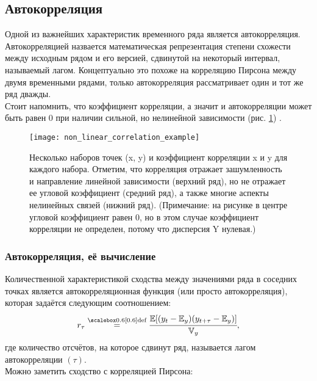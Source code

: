 \subsection{Автокорреляция}

Одной из важнейших характеристик временного ряда является автокорреляция. Автокорреляцией 
назвается математическая репрезентация степени \guillemotleft схожести\guillemotright {} между 
исходным рядом и его версией, сдвинутой на некоторый интервал, называемый лагом. Концептуально 
это похоже на корреляцию Пирсона между двумя временными рядами, только автокорреляция рассматривает 
один и тот же ряд дважды. \\

Стоит напомнить, что коэффициент корреляции, а значит и автокорреляции может быть равен 0 при наличии сильной, 
но нелинейной зависимости (рис. \ref{fig:non_linear_correlation_example}) \cite{pml1Book}.\\

\begin{figure}[h!]
    \centering
    \texttt{[image: non\_linear\_correlation\_example]}
    \caption{Несколько наборов точек (x, y) и коэффициент корреляции x и y
    для каждого набора. Отметим, что корреляция отражает зашумленность и направление 
    линейной зависимости (верхний ряд), но не отражает ее угловой
    коэффициент (средний ряд), а также многие аспекты нелинейных связей (нижний ряд). 
    (Примечание: на рисунке в центре угловой коэффициент равен 0, но
    в этом случае коэффициент корреляции не определен, потому что дисперсия Y
    нулевая.)}
    \label{fig:non_linear_correlation_example}
\end{figure}

\subsubsection{Автокорреляция, её вычисление}

Количественной характеристикой сходства между значениями ряда в соседних точках является 
автокорреляционная функция (или просто автокорреляция), которая задаётся следующим соотношением:\\

\begin{equation*}
    r_\tau \defeq \cfrac{\mathbb{E}[(y_t - \mathbb{E}_y)(y_{t+\tau} - \mathbb{E}_y)]}{\mathbb{V}_y},
\end{equation*}
где количество отсчётов, на которое сдвинут ряд, называется лагом автокорреляции $(\tau)$.\\
Можно заметить сходство с корреляцией Пирсона:


